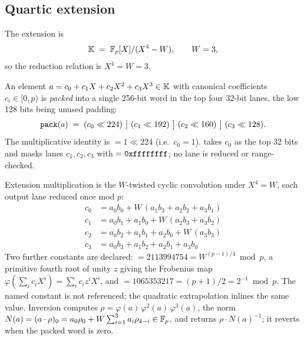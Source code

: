 \subsection{Quartic extension}

\begin{definition}
The extension is
\[
  \mathbb{K} \;=\; \mathbb{F}_p[X]/(X^4 - W), \qquad W = 3 ,
\]
so the reduction relation is $X^4 = W = 3$.
\end{definition}

An element $a = c_0 + c_1 X + c_2 X^2 + c_3 X^3 \in \mathbb{K}$ with canonical coefficients
$c_i \in [0,p)$ is \emph{packed} into a single 256-bit word in the top four 32-bit
lanes, the low 128 bits being unused padding:
\[
  \texttt{pack}(a) \;=\; (c_0 \ll 224)\ \big|\ (c_1 \ll 192)\ \big|\ (c_2 \ll 160)\ \big|\ (c_3 \ll 128).
\]
The multiplicative identity is  $= 1 \ll 224$ (i.e.\ $c_0=1$). 
takes $c_0$ as the top 32 bits and masks lanes $c_1,c_2,c_3$ with
 $=\texttt{0xffffffff}$; no lane is reduced or range-checked.

Extension multiplication is the $W$-twisted cyclic convolution under $X^4=W$, each
output lane reduced once mod $p$:
\begin{align}
  c_0 &= a_0 b_0 + W\,(a_1 b_3 + a_2 b_2 + a_3 b_1)\\
  c_1 &= a_0 b_1 + a_1 b_0 + W\,(a_2 b_3 + a_3 b_2)\\
  c_2 &= a_0 b_2 + a_1 b_1 + a_2 b_0 + W\,(a_3 b_3)\\
  c_3 &= a_0 b_3 + a_1 b_2 + a_2 b_1 + a_3 b_0
\end{align}
Two further constants are declared:  $= 2113994754 = W^{(p-1)/4} \bmod p$,
a primitive fourth root of unity $z$ giving the Frobenius map
$\varphi(\sum_i c_i X^i) = \sum_i c_i z^i X^i$, and
 $= 1065353217 = (p+1)/2 = 2^{-1} \bmod p$.
The named  constant is not referenced; the quadratic extrapolation
inlines the same value.
Inversion computes $\rho = \varphi(a)\,\varphi^2(a)\,\varphi^3(a)$, the norm
$N(a) = (a\cdot\rho)_0 = a_0\rho_0 + W\sum_{i=1}^{3} a_i \rho_{4-i} \in \mathbb{F}_p$, and returns
$\rho \cdot N(a)^{-1}$; it reverts when the packed word is zero.

